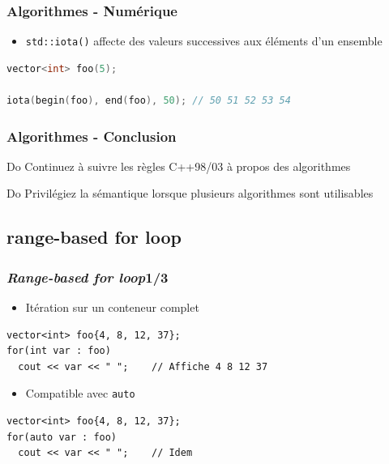 \documentclass[C++.tex]{subfiles}
\begin{document}
\begin{frame}[fragile]
	\frametitle{Algorithmes - Numérique}
	\begin{itemize}
		\item \lstinline|std::iota()| affecte des valeurs successives aux éléments d'un ensemble
	\end{itemize}

	\begin{lstlisting}[language=C++]
vector<int> foo(5);

iota(begin(foo), end(foo), 50); // 50 51 52 53 54\end{lstlisting}
\end{frame}

\begin{frame}[fragile]
	\frametitle{Algorithmes - Conclusion}
	\begin{exampleblock}{Do}
		Continuez à suivre les règles C++98/03 à propos des algorithmes
	\end{exampleblock}

	\begin{exampleblock}{Do}
		Privilégiez la sémantique lorsque plusieurs algorithmes sont utilisables
	\end{exampleblock}
\end{frame}

\subsection*{range-based for loop}
\begin{frame}[fragile]
	\frametitle{\textit{Range-based for loop}\titlehfill{}1/3}
	\begin{itemize}
		\item Itération sur un \og conteneur\fg{} complet
	\end{itemize}

	\begin{lstlisting}
vector<int> foo{4, 8, 12, 37};
for(int var : foo)
  cout << var << " ";    // Affiche 4 8 12 37\end{lstlisting}

	\begin{itemize}
		\item Compatible avec \lstinline|auto|
	\end{itemize}

	\begin{lstlisting}
vector<int> foo{4, 8, 12, 37};
for(auto var : foo)
  cout << var << " ";    // Idem\end{lstlisting}
\end{frame}
\end{document}
